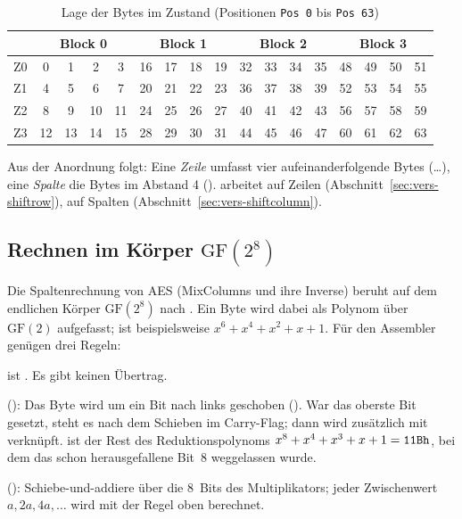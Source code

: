 \begin{table}[!htbp]
    \centering
    \small
    \setlength{\tabcolsep}{5pt}
    \caption{Lage der Bytes im Zustand (Positionen \texttt{Pos 0} bis \texttt{Pos 63})}\label{tab:zustand}
    \begin{tabular}{@{}c|cccc|cccc|cccc|cccc@{}}
        & \multicolumn{4}{c|}{Block 0} & \multicolumn{4}{c|}{Block 1} & \multicolumn{4}{c|}{Block 2} & \multicolumn{4}{c}{Block 3} \\
        \hline
        Z0 &  0 &  1 &  2 &  3 & 16 & 17 & 18 & 19 & 32 & 33 & 34 & 35 & 48 & 49 & 50 & 51 \\
        Z1 &  4 &  5 &  6 &  7 & 20 & 21 & 22 & 23 & 36 & 37 & 38 & 39 & 52 & 53 & 54 & 55 \\
        Z2 &  8 &  9 & 10 & 11 & 24 & 25 & 26 & 27 & 40 & 41 & 42 & 43 & 56 & 57 & 58 & 59 \\
        Z3 & 12 & 13 & 14 & 15 & 28 & 29 & 30 & 31 & 44 & 45 & 46 & 47 & 60 & 61 & 62 & 63 \\
    \end{tabular}
\end{table}

Aus der Anordnung folgt: Eine \emph{Zeile} umfasst vier aufeinanderfolgende Bytes (\ldots{}), eine \emph{Spalte} die Bytes im Abstand 4 ().  arbeitet auf Zeilen (Abschnitt~\ref{sec:vers-shiftrow}),  auf Spalten (Abschnitt~\ref{sec:vers-shiftcolumn}).

\subsection{Rechnen im Körper \texorpdfstring{$\mathrm{GF}(2^8)$}{GF(2 hoch 8)}}\label{sec:gf}
Die Spaltenrechnung von AES (MixColumns und ihre Inverse) beruht auf dem endlichen Körper $\mathrm{GF}(2^8)$ nach \cite{fips197}. Ein Byte wird dabei als Polynom über $\mathrm{GF}(2)$ aufgefasst;  ist beispielsweise $x^6+x^4+x^2+x+1$. Für den Assembler genügen drei Regeln:

\begin{description}[leftmargin=!,labelwidth=3.4cm,noitemsep]
    \item[Addition] ist . Es gibt keinen Übertrag.
    \item[Multiplikation mit 2] (): Das Byte wird um ein Bit nach links geschoben (). War das oberste Bit gesetzt, steht es nach dem Schieben im Carry-Flag; dann wird zusätzlich mit  verknüpft.  ist der Rest des Reduktionspolynoms $x^8+x^4+x^3+x+1=\texttt{11Bh}$, bei dem das schon herausgefallene Bit~8 weggelassen wurde.
    \item[Multiplikation allgemein] (): Schiebe-und-addiere über die 8~Bits des Multiplikators; jeder Zwischenwert $a,2a,4a,\ldots$ wird mit der Regel oben berechnet.
\end{description}

